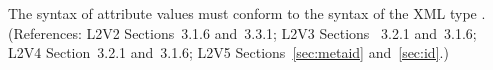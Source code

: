 The syntax of  attribute values must conform to the syntax of the
XML type .  (References: L2V2 Sections~3.1.6 and~3.3.1;
L2V3 Sections ~3.2.1 and~3.1.6; L2V4 Section~3.2.1 and~3.1.6; L2V5 Sections~\ref{sec:metaid} and~\ref{sec:id}.)
